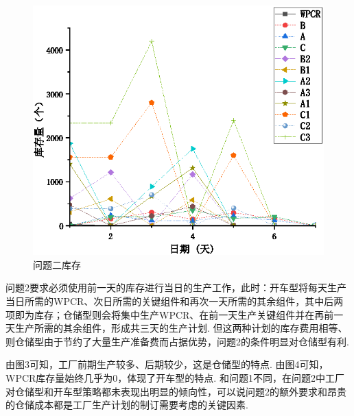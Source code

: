 \begin{figure}[!htbp]
	\centering
	\includegraphics{Image/问题二库存.eps}
	\caption{问题二库存}\label{每日库存数量}
\end{figure}

问题2要求必须使用前一天的库存进行当日的生产工作，此时：开车型将每天生产当日所需的WPCR、次日所需的关键组件和再次一天所需的其余组件，其中后两项即为库存；仓储型则会将集中生产WPCR、在前一天生产关键组件并在再前一天生产所需的其余组件，形成共三天的生产计划.
但这两种计划的库存费用相等、则仓储型由于节约了大量生产准备费而占据优势，问题2的条件明显对仓储型有利.

由图3可知，工厂前期生产较多、后期较少，这是仓储型的特点.
由图4可知，WPCR库存量始终几乎为0，体现了开车型的特点.
和问题1不同，在问题2中工厂对仓储型和开车型策略都未表现出明显的倾向性，可以说问题2的额外要求和昂贵的仓储成本都是工厂生产计划的制订需要考虑的关键因素.

